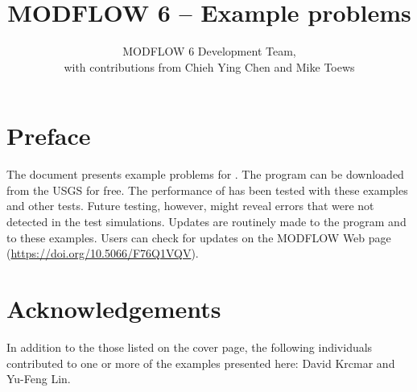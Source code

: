 \documentclass[11pt,twoside,onecolumn]{article}
\title{\color{white} MODFLOW 6 -- Example problems}
\author{\color{white} MODFLOW 6 Development Team, \\
\color{white} with contributions from Chieh Ying Chen and Mike Toews}
\date{\color{white} \currentmodflowversion}
\begin{document}
\raggedright
\onecolumn
{}
\setlength{\parindent}{1.5pc}

\begingroup
{}\selectfont
\maketitle
\endgroup

\newpage
\section*{Preface}
The document presents example problems for \mf.  The \mf program can be downloaded from the USGS for free.  The performance of \mf has been tested with these examples and other tests.  Future testing, however, might reveal errors that were not detected in the test simulations.  Updates are routinely made to the \mf program and to these examples.  Users can check for updates on the MODFLOW Web page (\url{https://doi.org/10.5066/F76Q1VQV}).

\section*{Acknowledgements}
In addition to the those listed on the cover page, the following individuals contributed to one or more of the examples presented here: David Krcmar and Yu-Feng Lin. 

\newpage
\tableofcontents

\newpage
\listoffigures

\newpage
\listoftables

\insection



\clearpage
\inreferences

\end{document}
